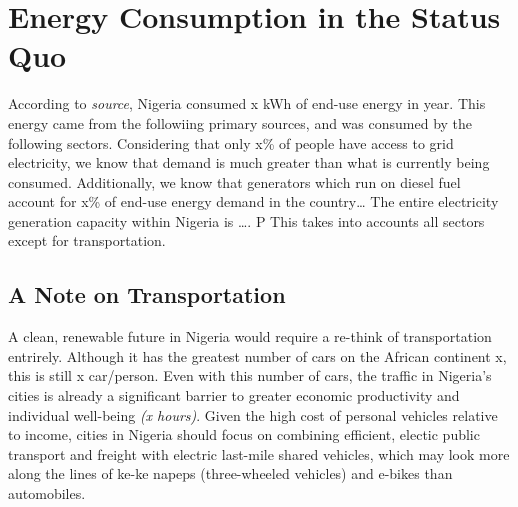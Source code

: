 \documentclass[
  letterpaper,
  DIV=11,
  numbers=noendperiod]{scrartcl}
\begin{document}
\hypertarget{energy-consumption-in-the-status-quo}{%
\section{Energy Consumption in the Status
Quo}\label{energy-consumption-in-the-status-quo}}

According to \emph{source}, Nigeria consumed x kWh of end-use energy in
year. This energy came from the followiing primary sources, and was
consumed by the following sectors. Considering that only x\% of people
have access to grid electricity, we know that demand is much greater
than what is currently being consumed. Additionally, we know that
generators which run on diesel fuel account for x\% of end-use energy
demand in the country\ldots{} The entire electricity generation capacity
within Nigeria is \ldots. P This takes into accounts all sectors except
for transportation.

\hypertarget{a-note-on-transportation}{%
\subsection{A Note on Transportation}\label{a-note-on-transportation}}

A clean, renewable future in Nigeria would require a re-think of
transportation entrirely. Although it has the greatest number of cars on
the African continent x, this is still x car/person. Even with this
number of cars, the traffic in Nigeria's cities is already a significant
barrier to greater economic productivity and individual well-being
\emph{(x hours)}. Given the high cost of personal vehicles relative to
income, cities in Nigeria should focus on combining efficient, electic
public transport and freight with electric last-mile shared vehicles,
which may look more along the lines of ke-ke napeps (three-wheeled
vehicles) and e-bikes than automobiles.
\end{document}
